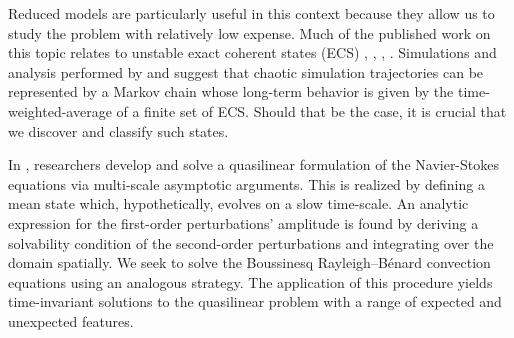 \documentclass[reprint,amsmath,amssymb,aps]{revtex4-1}
\begin{document}
Reduced models are particularly useful in this context because they allow us to study the problem with relatively low expense. 
Much of the published work on this topic relates to unstable exact coherent states (ECS) \cite{Waleffe}, \cite{Sondak}, \cite{Wen}, \cite{chini_cells}. 
Simulations and analysis performed by \cite{Yalniz} and \cite{Cvitanovic} suggest that chaotic simulation trajectories can be represented by a Markov chain whose long-term behavior is given by the time-weighted-average of a finite set of ECS. Should that be the case, it is crucial that we discover and classify such states.

In \cite{Chini_sw}, researchers develop and solve a quasilinear formulation of the Navier-Stokes equations via multi-scale asymptotic arguments. This is realized by defining a mean state which, hypothetically, evolves on a slow time-scale. An analytic expression for the first-order perturbations' amplitude is found by deriving a solvability condition of the second-order perturbations and integrating over the domain spatially. 
We seek to solve the Boussinesq Rayleigh–Bénard convection equations using an analogous strategy. 
The application of this procedure yields time-invariant solutions to the quasilinear problem with a range of expected and unexpected features. 
\end{document}
